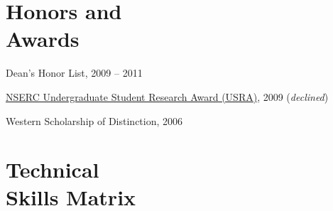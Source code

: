 \documentclass[margin,line]{resume}
\begin{document}
\begin{resume}
\section{\mysidestyle Honors and\\Awards}

\begin{list2}
	\item Dean's Honor List, 2009 -- 2011
	\item \href{http://www.uwo.ca/research/funding/internal/nserc_usra.html}{NSERC Undergraduate Student Research Award (USRA)}, 2009	\hfill(\textsl{declined})
	\item Western Scholarship of Distinction, 2006 
\end{list2}



\section{\mysidestyle Technical\\Skills Matrix} 

\begin{tabular}{@{}p{1.75in}p{1.75in}p{1.75in}}


\end{tabular}
\end{resume}
\end{document}
